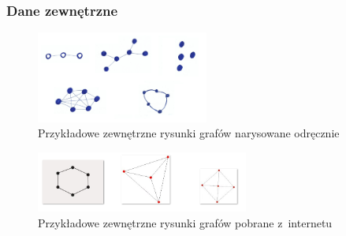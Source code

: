 \begin{frame}
    \frametitle{Dane zewnętrzne}

    \begin{figure}[ht]
        \centering
        \includegraphics[height=3cm]{../thesis/resources/model/images/ext-graphs-drawn.png}
        \caption{Przykładowe zewnętrzne rysunki grafów narysowane odręcznie}
    \end{figure}
    
    \begin{figure}[ht]
        \centering
        \includegraphics[height=2cm]{../thesis/resources/model/images/ext-graphs-internet.png}
        \caption{Przykładowe zewnętrzne rysunki grafów pobrane z~internetu}
    \end{figure}

\end{frame}